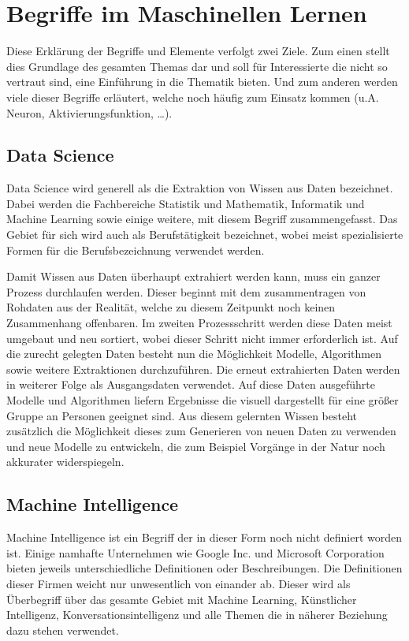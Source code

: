 \chapter{Begriffe im Maschinellen Lernen}
\label{cha:Begriffe}

Diese Erklärung der Begriffe und Elemente verfolgt zwei Ziele.
Zum einen stellt dies Grundlage des gesamten Themas dar und soll für Interessierte die nicht so vertraut sind, eine Einführung in die Thematik bieten. 
Und zum anderen werden viele dieser Begriffe erläutert, welche noch häufig zum Einsatz kommen (u.A. Neuron, Aktivierungsfunktion, …).

\section{Data Science}

Data Science wird generell als die Extraktion von Wissen aus Daten bezeichnet. 
Dabei werden die Fachbereiche Statistik und Mathematik, Informatik und Machine Learning sowie einige weitere, mit diesem Begriff zusammengefasst. 
Das Gebiet für sich wird auch als Berufstätigkeit bezeichnet, wobei meist spezialisierte Formen für die Berufsbezeichnung verwendet werden. \newline

\noindent 
Damit Wissen aus Daten überhaupt extrahiert werden kann, muss ein ganzer Prozess durchlaufen werden. 
Dieser beginnt mit dem zusammentragen von Rohdaten aus der Realität, welche zu diesem Zeitpunkt noch keinen Zusammenhang offenbaren. 
Im zweiten Prozessschritt werden diese Daten meist umgebaut und neu sortiert, wobei dieser Schritt nicht immer erforderlich ist. 
Auf die zurecht gelegten Daten besteht nun die Möglichkeit Modelle, Algorithmen sowie weitere Extraktionen durchzuführen. 
Die erneut extrahierten Daten werden in weiterer Folge als Ausgangsdaten verwendet. 
Auf diese Daten ausgeführte Modelle und Algorithmen liefern Ergebnisse die visuell dargestellt für eine größer Gruppe an Personen geeignet sind. 
Aus diesem gelernten Wissen besteht zusätzlich die Möglichkeit dieses zum Generieren von neuen Daten zu verwenden und neue Modelle zu entwickeln, die zum Beispiel Vorgänge in der Natur noch akkurater widerspiegeln.

\section{Machine Intelligence}

Machine Intelligence ist ein Begriff der in dieser Form noch nicht definiert worden ist. 
Einige namhafte Unternehmen wie Google Inc. und Microsoft Corporation bieten jeweils unterschiedliche Definitionen oder Beschreibungen. 
Die Definitionen dieser Firmen weicht nur unwesentlich von einander ab.
Dieser wird als Überbegriff über das gesamte Gebiet mit Machine Learning, Künstlicher Intelligenz, Konversationsintelligenz und alle Themen die in näherer Beziehung dazu stehen verwendet. 

